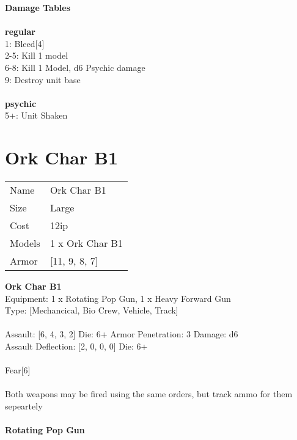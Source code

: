 {\bf Damage Tables} \\
\ \\ {\bf regular } \\
1: Bleed[4] \\
2-5: Kill 1 model \\
6-8: Kill 1 Model, d6 Psychic damage \\
9: Destroy unit base \\
\ \\ {\bf psychic } \\
5+: Unit Shaken \\










\pagebreak\pagebreak

\section{ Ork Char B1 }

\begin{tabular}{ll}
  Name & Ork Char B1 \\
  Size & Large\\
  Cost & 12ip\\
  Models & 1 x Ork Char B1\\
  Armor & [11, 9, 8, 7]\\
\end{tabular}

\noindent 

{\bf Ork Char B1 } \\
Equipment: 1 x Rotating Pop Gun, 1 x Heavy Forward Gun \\
Type: [Mechancical, Bio Crew, Vehicle, Track] \\
\ \\
Assault: [6, 4, 3, 2] Die: 6+ Armor Penetration: 3 Damage: d6 \\
Assault Deflection: [2, 0, 0, 0] Die: 6+\\
\\ 
Fear[6]\\ 
 
\ \\
Both weapons may be fired using the same orders, but track ammo for them sepeartely\\ 

\ \\
{\bf Rotating Pop Gun } \\



